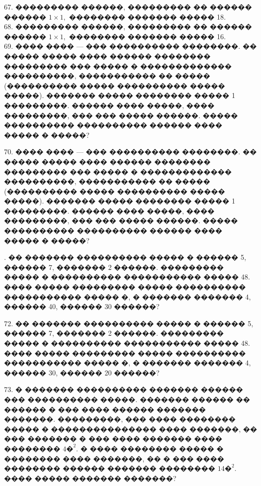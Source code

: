 \documentclass[12pt]{article}
\begin{document}
67. ��������� ������, ��������� �� ������ ������ $1\times1,$ �������� ������� ����� 18.\\
68. ��������� ������, ��������� �� ������ ������ $1\times1,$ �������� ������� ����� 16.\\
69. ���� ���� --- ��� ���������� ��������. �� ����� ����� ���� ������ �������� ��������� ��� ����� � ������������� ����������, ����������� �� ����� (���������� ����� ���������� ����� �����). ������� ����� �������� ����� 1 ���������. ������ ���� �����, ���� ���������, ��� ��� ����� ������. ����� ���������� ���������� ������ ���� ����� � �����?
\begin{center}
\begin{figure}[ht!]
\end{figure}
\end{center}
70. ���� ���� --- ��� ���������� ��������. �� ����� ����� ���� ������ �������� ��������� ��� ����� � ������������� ����������, ����������� �� ����� (���������� ����� ���������� ����� �����). ������� ����� �������� ����� 1 ���������. ������ ���� �����, ���� ���������, ��� ��� ����� ������. ����� ���������� ���������� ������ ���� ����� � �����?
\begin{center}
\begin{figure}[ht!]
\end{figure}
\end{center}
\newpage
{}. �� ������� ���������� ����� � ������ 5, ������ 7, ������� 2 ������. ��������� ����� � ���������� ����������� ����� 48. ���� ����� ��������� ����� ���������� ����������� ����� �, � ������� ������� 4, ������ 40, ������ 30 ������?
\begin{center}
\begin{figure}[ht!]
\end{figure}
\end{center}
72. �� ������� ���������� ����� � ������ 5, ������ 7, ������� 2 ������. ��������� ����� � ���������� ����������� ����� 48. ���� ����� ��������� ����� ���������� ����������� ����� �, � ������� ������� 4, ������ 30, ������ 20 ������?
\begin{center}
\begin{figure}[ht!]
\end{figure}
\end{center}
73. � ������� ���������� ������� ������ ��� ���������� �����. ������� ������ �� ������ � ��� ���� ������ ������� �������. ���������, ��� ���� �������� ����� � ��������������� ���� �������, �� ��� ������� � ��� ���� ������� ���� �������� $4\text{�}^2.$ � ���� �������� ����� � �������� ���� �������, �� � ��� ���� �������� ������ ������� �������� $14\text{�}^2.$ ���� ����� ������� �������?\\
\end{document}
